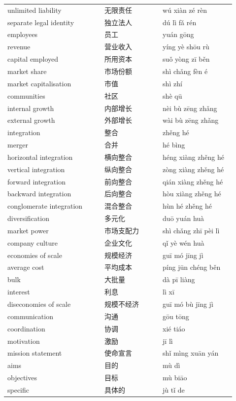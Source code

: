 \documentclass[11pt]{article}
\begin{document}
\begin{longtable}{@{}p{0.40\linewidth}p{0.24\linewidth}p{0.30\linewidth}@{}}
unlimited liability & 无限责任 & wú xiàn zé rèn \\
separate legal identity & 独立法人 & dú lì fǎ rén \\
employees & 员工 & yuán gōng \\
revenue & 营业收入 & yíng yè shōu rù \\
capital employed & 所用资本 & suǒ yòng zī běn \\
market share & 市场份额 & shì chǎng fèn é \\
market capitalisation & 市值 & shì zhí \\
communities & 社区 & shè qū \\
internal growth & 内部增长 & nèi bù zēng zhǎng \\
external growth & 外部增长 & wài bù zēng zhǎng \\
integration & 整合 & zhěng hé \\
merger & 合并 & hé bìng \\
horizontal integration & 横向整合 & héng xiàng zhěng hé \\
vertical integration & 纵向整合 & zòng xiàng zhěng hé \\
forward integration & 前向整合 & qián xiàng zhěng hé \\
backward integration & 后向整合 & hòu xiàng zhěng hé \\
conglomerate integration & 混合整合 & hùn hé zhěng hé \\
diversification & 多元化 & duō yuán huà \\
market power & 市场支配力 & shì chǎng zhī pèi lì \\
company culture & 企业文化 & qǐ yè wén huà \\
economies of scale & 规模经济 & guī mó jīng jì \\
average cost & 平均成本 & píng jūn chéng běn \\
bulk & 大批量 & dà pī liàng \\
interest & 利息 & lì xī \\
diseconomies of scale & 规模不经济 & guī mó bù jīng jì \\
communication & 沟通 & gōu tōng \\
coordination & 协调 & xié tiáo \\
motivation & 激励 & jī lì \\
mission statement & 使命宣言 & shǐ mìng xuān yán \\
aims & 目的 & mù dì \\
objectives & 目标 & mù biāo \\
specific & 具体的 & jù tǐ de \\

\end{longtable}
\end{document}

